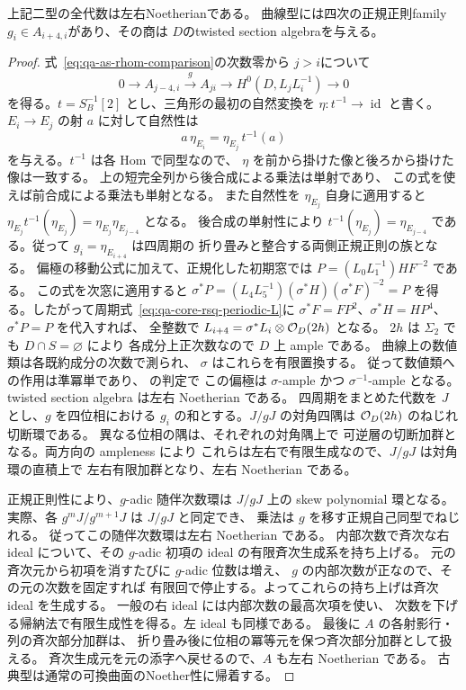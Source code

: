\begin{proposition}[左右Noether性]
\label{prop:qa-as-avatar-noetherian}
上記二型の全代数は左右Noetherianである。
曲線型には四次の正規正則family
$g_i\in A_{i+4,i}$があり、その商は
$D$のtwisted section algebraを与える。
\end{proposition}
\begin{proof}
式~\eqref{eq:qa-as-rhom-comparison}の次数零から
$j>i$について
\[
0\to A_{j-4,i}\xrightarrow{\,g\,}A_{ji}
\to H^0(D,L_jL_i^{-1})\to0
\]
を得る。$t=S_B^{-1}[2]$ とし、三角形の最初の自然変換を
$\eta:t^{-1}\to\operatorname{id}$ と書く。
$E_i\to E_j$ の射 $a$ に対して自然性は
\[
 a\,\eta_{E_i}=\eta_{E_j}\,t^{-1}(a)
\]
を与える。$t^{-1}$ は各 Hom で同型なので、
$\eta$ を前から掛けた像と後ろから掛けた像は一致する。
上の短完全列から後合成による乗法は単射であり、
この式を使えば前合成による乗法も単射となる。
また自然性を $\eta_{E_j}$ 自身に適用すると
$\eta_{E_j}t^{-1}(\eta_{E_j})=
\eta_{E_j}\eta_{E_{j-4}}$ となる。
後合成の単射性により $t^{-1}(\eta_{E_j})=\eta_{E_{j-4}}$
である。従って $g_i=\eta_{E_{i+4}}$ は四周期の
折り畳みと整合する両側正規正則の族となる。
偏極の移動公式に加えて、正規化した初期窓では
$P=(L_0L_1^{-1})HF^{-2}$ である。
この式を次窓に適用すると
$\sigma^*P=(L_4L_5^{-1})(\sigma^*H)(\sigma^*F)^{-2}=P$
を得る。したがって周期式~\eqref{eq:qa-core-rsq-periodic-L}に
$\sigma^*F=FP^2$、$\sigma^*H=HP^4$、$\sigma^*P=P$ を代入すれば、
全整数で $L_{i+4}=\sigma^*L_i\otimes\mathcal O_D(2h)$ となる。
$2h$ は $\Sigma_2$ でも $D\cap S=\varnothing$ により
各成分上正次数なので $D$ 上 ample である。
曲線上の数値類は各既約成分の次数で測られ、
$\sigma$ はこれらを有限置換する。
従って数値類への作用は準冪単であり、
\cite{Keeler2003,Keeler2018Corrigendum} の判定で
この偏極は $\sigma$-ample かつ $\sigma^{-1}$-ample となる。
twisted section algebra は左右 Noetherian である。
四周期をまとめた代数を $J$ とし、$g$ を四位相における
$g_i$ の和とする。$J/gJ$ の対角四隅は
$\mathcal O_D(2h)$ のねじれ切断環である。
異なる位相の隅は、それぞれの対角隅上で
可逆層の切断加群となる。両方向の ampleness により
これらは左右で有限生成なので、$J/gJ$ は対角環の直積上で
左右有限加群となり、左右 Noetherian である。

正規正則性により、$g$-adic 随伴次数環は
$J/gJ$ 上の skew polynomial 環となる。
実際、各 $g^mJ/g^{m+1}J$ は $J/gJ$ と同定でき、
乗法は $g$ を移す正規自己同型でねじれる。
従ってこの随伴次数環は左右 Noetherian である。
内部次数で斉次な右 ideal について、その $g$-adic 初項の
ideal の有限斉次生成系を持ち上げる。
元の斉次元から初項を消すたびに $g$-adic 位数は増え、
$g$ の内部次数が正なので、その元の次数を固定すれば
有限回で停止する。よってこれらの持ち上げは斉次 ideal を生成する。
一般の右 ideal には内部次数の最高次項を使い、
次数を下げる帰納法で有限生成性を得る。左 ideal も同様である。
最後に $A$ の各射影行・列の斉次部分加群は、
折り畳み後に位相の冪等元を保つ斉次部分加群として扱える。
斉次生成元を元の添字へ戻せるので、$A$ も左右 Noetherian である。
古典型は通常の可換曲面のNoether性に帰着する。
\end{proof}

